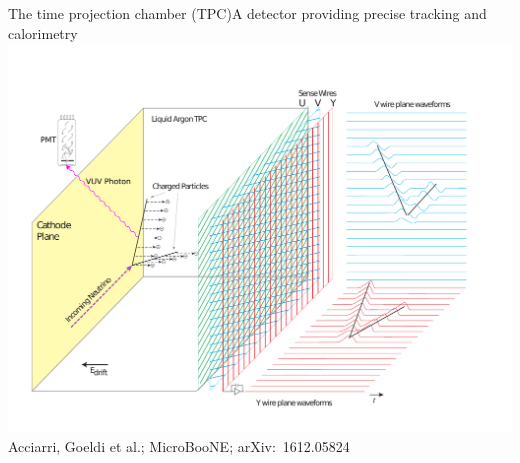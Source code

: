 \documentclass[]{beamer}
\newcommand*{\uboone}{{MicroBooNE}}
\begin{document}
\begin{frame}{The time projection chamber (TPC)}{A detector providing precise tracking and calorimetry}
	\centering
	\includegraphics[viewport=35 40 720 540, clip, height=.66\textheight]{defence/TPCprinciple}\\
	{\tiny Acciarri, Goeldi et al.; \uboone{}; arXiv:~1612.05824~\cite{uboone}}
\end{frame}
\end{document}

